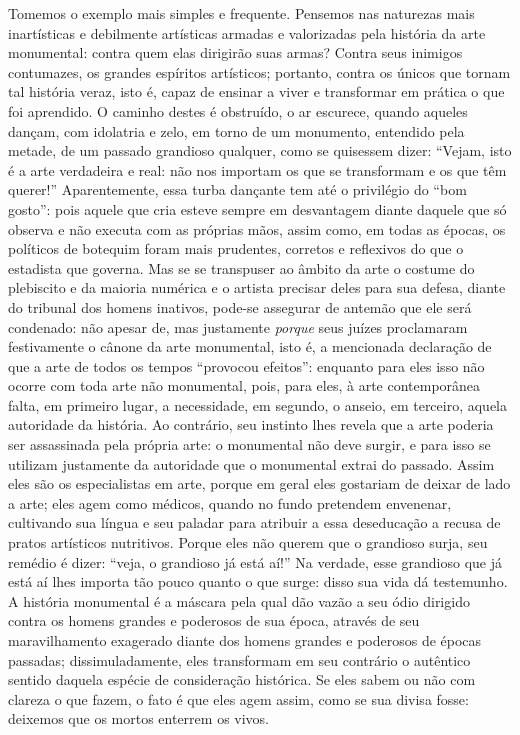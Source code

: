 Tomemos o exemplo mais simples e frequente. Pensemos nas naturezas mais
inartísticas e debilmente artísticas armadas e valorizadas pela história
da arte monumental: contra quem elas dirigirão suas armas? Contra seus
inimigos contumazes, os grandes espíritos artísticos; portanto, contra
os únicos que tornam tal história veraz, isto é, capaz de ensinar a
viver e transformar em prática o que foi aprendido. O caminho destes é
obstruído, o ar escurece, quando aqueles dançam, com idolatria e zelo,
em torno de um monumento, entendido pela metade, de um passado grandioso
qualquer, como se quisessem dizer: ``Vejam, isto é a arte verdadeira e
real: não nos importam os que se transformam e os que têm querer!''
Aparentemente, essa turba dançante tem até o privilégio do ``bom
gosto'': pois aquele que cria esteve sempre em desvantagem diante
daquele que só observa e não executa com as próprias mãos, assim como,
em todas as épocas, os políticos de botequim foram mais prudentes,
corretos e reflexivos do que o estadista que governa. Mas se se
transpuser ao âmbito da arte o costume do plebiscito e da maioria
numérica e o artista precisar deles para sua defesa, diante do tribunal
dos homens inativos, pode-se assegurar de antemão que ele será
condenado: não apesar de, mas justamente \emph{porque} seus juízes
proclamaram festivamente o cânone da arte monumental, isto é, a
mencionada declaração de que a arte de todos os tempos ``provocou
efeitos'': enquanto para eles isso não ocorre com toda arte
não monumental, pois, para eles, à arte contemporânea falta, em primeiro
lugar, a necessidade, em segundo, o anseio, em terceiro, aquela
autoridade da história. Ao contrário, seu instinto lhes revela que a
arte poderia ser assassinada pela própria arte: o monumental não deve
surgir, e para isso se utilizam justamente da autoridade que o
monumental extrai do passado. Assim eles são os especialistas em arte,
porque em geral eles gostariam de deixar de lado a arte; eles agem como
médicos, quando no fundo pretendem envenenar, cultivando sua língua e
seu paladar para atribuir a essa deseducação a recusa de pratos
artísticos nutritivos. Porque eles não querem que o grandioso surja, seu
remédio é dizer: ``veja, o grandioso já está aí!'' Na verdade, esse
grandioso que já está aí lhes importa tão pouco quanto o que surge:
disso sua vida dá testemunho. A história monumental é a máscara pela
qual dão vazão a seu ódio dirigido contra os homens grandes e poderosos
de sua época, através de seu maravilhamento exagerado diante dos homens
grandes e poderosos
 de épocas passadas; dissimuladamente, eles
transformam em seu contrário o autêntico sentido daquela espécie de
consideração histórica. Se eles sabem ou não com clareza o que fazem, o
fato é que eles agem assim, como se sua divisa fosse: deixemos que os
mortos enterrem os vivos.

